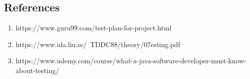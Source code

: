 \subsection{References}
\begin{enumerate}
  \item https://www.guru99.com/test-plan-for-project.html
  \item https://www.ida.liu.se/~TDDC88/theory/07esting.pdf
  \item https://www.udemy.com/course/what-a-java-software-developer-must-know-about-testing/
\end{enumerate}
\clearpage